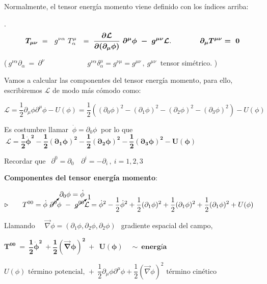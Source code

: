 Normalmente, el tensor energía momento viene definido con los índices arriba:

\begin{definition}
.	\begin{equation}
	\label{T34TEMcontra}	
	\boldsymbol{ T_{\mu \nu} } \ = \ \ g^{\nu \alpha} \ T^\mu_\alpha \ \ = \ \displaystyle \boldsymbol{ \pdv{\mathcal L}{(\partial_\mu \phi)} \  \partial^\mu \phi  \ - \ g^{\mu \nu} \mathcal L }. \qquad \qquad \boldsymbol{\partial_\mu T^{\mu \nu} = \ 0}
	\end{equation}
\end{definition}

\begin{center}\textcolor{gris}{($\ g^{\nu \alpha} \partial_\alpha \ = \ \partial^\nu \qquad \qquad\qquad g^{\nu \alpha} \delta^\mu_\alpha=g^{\nu \mu}=g^{\mu \nu}\, , \ g^{\mu \nu}\ $ tensor simétrico. )}\end{center}

\vspace{5mm} Vamos a calcular las componentes del tensor energía momento, para ello, escribiremos $\mathcal L$ de modo más cómodo como:

$\mathcal L=\dfrac 1 2 \partial_\mu \phi \partial^\mu \phi - U(\phi)=\dfrac 1 2 \left( (\partial_0 \phi)^2-(\partial_1 \phi)^2-(\partial_2 \phi)^2-(\partial_3 \phi)^2 \right) - U(\phi)$

Es costumbre llamar $\ \dot \phi=\partial_0 \phi\ $ por lo que $\ \boldsymbol{ \mathcal L= \dfrac 1 2 \dot \phi^2- \dfrac 1 2 (\partial_1 \phi)^2-\dfrac 1 2 (\partial_2 \phi)^2-\dfrac 1 2 (\partial_3 \phi)^2 - U(\phi)} \ $

\textcolor{gris}{Recordar que $\ \ \partial^0=\partial_0 \quad \partial^i=-\partial_i\, , \ i=1,2,3$}

\vspace{5mm}
\textbf{Componentes del tensor energía momento}:

$\triangleright \qquad \displaystyle T^{00}=\dot \phi \ \cancelto{ \partial_0 \phi=\dot \phi}{\partial^0} \phi \ - \  \cancelto{1}{g^{00}} \mathcal L = \dot \phi^2-\dfrac 1 2 \dot \phi^2+ \dfrac 1 2 (\partial_1 \phi)^2+\dfrac 1 2 (\partial_1 \phi)^2+\dfrac 1 2 (\partial_1 \phi)^2 + U(\phi)$ 

Llamando $\quad\overrightarrow \nabla \phi=(\partial_1\phi,\partial_2\phi,\partial_2\phi)\, \ $ gradiente espacial del campo,
 
$\boldsymbol{T^{00} \ = \ \dfrac 1 2 \dot \phi^2 \ + \dfrac 1 2 (\overrightarrow \nabla \phi)^2 \ + \  \ U(\phi)} \quad \sim \ \textbf{energía} \qquad $ \begin{tiny}$U(\phi) \text{ término potencial, } + \ \dfrac12\partial_\mu \phi \partial^\mu \phi + \dfrac 1 2 (\overrightarrow \nabla \phi)^2 \text{ término cinético}$\end{tiny}

